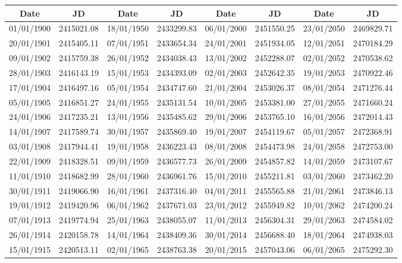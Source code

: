 \clearpage
\begin{table}[!h]
\vspace{0.25cm}
\centering
{\scriptsize
\begin{tabular}{cc|cc|cc|cc}
Date & JD &Date & JD &Date & JD & Date & JD\\\hline
01/01/1900 &  2415021.08 &  18/01/1950 &  2433299.83 & 06/01/2000 &  2451550.25 &23/01/2050 & 2469829.71\\
20/01/1901 &  2415405.11 &  07/01/1951 &  2433654.34 & 24/01/2001 &  2451934.05 &12/01/2051 & 2470184.29\\
09/01/1902 &  2415759.38 &  26/01/1952 &  2434038.43 & 13/01/2002 &  2452288.07 &02/01/2052 & 2470538.62\\
28/01/1903 &  2416143.19 &  15/01/1953 &  2434393.09 & 02/01/2003 &  2452642.35 &19/01/2053 & 2470922.46\\
17/01/1904 &  2416497.16 &  05/01/1954 &  2434747.60 & 21/01/2004 &  2453026.37 &08/01/2054 & 2471276.44\\
05/01/1905 &  2416851.27 &  24/01/1955 &  2435131.54 & 10/01/2005 &  2453381.00 &27/01/2055 & 2471660.24\\
24/01/1906 &  2417235.21 &  13/01/1956 &  2435485.62 & 29/01/2006 &  2453765.10 &16/01/2056 & 2472014.43\\
14/01/1907 &  2417589.74 &  30/01/1957 &  2435869.40 & 19/01/2007 &  2454119.67 &05/01/2057 & 2472368.91\\
03/01/1908 &  2417944.41 &  19/01/1958 &  2436223.43 & 08/01/2008 &  2454473.98 &24/01/2058 & 2472753.00\\
22/01/1909 &  2418328.51 &  09/01/1959 &  2436577.73 & 26/01/2009 &  2454857.82 &14/01/2059 & 2473107.67\\
11/01/1910 &  2418682.99 &  28/01/1960 &  2436961.76 & 15/01/2010 &  2455211.81 &03/01/2060 & 2473462.20\\
30/01/1911 &  2419066.90 &  16/01/1961 &  2437316.40 & 04/01/2011 &  2455565.88 &21/01/2061 & 2473846.13\\
19/01/1912 &  2419420.96 &  06/01/1962 &  2437671.03 & 23/01/2012 &  2455949.82 &10/01/2062 & 2474200.24\\
07/01/1913 &  2419774.94 &  25/01/1963 &  2438055.07 & 11/01/2013 &  2456304.31 &29/01/2063 & 2474584.02\\
26/01/1914 &  2420158.78 &  14/01/1964 &  2438409.36 & 30/01/2014 &  2456688.40 &18/01/2064 & 2474938.03\\
15/01/1915 &  2420513.11 &  02/01/1965 &  2438763.38 & 20/01/2015 &  2457043.06 &06/01/2065 & 2475292.30\\

\end{tabular}}
\end{table}
